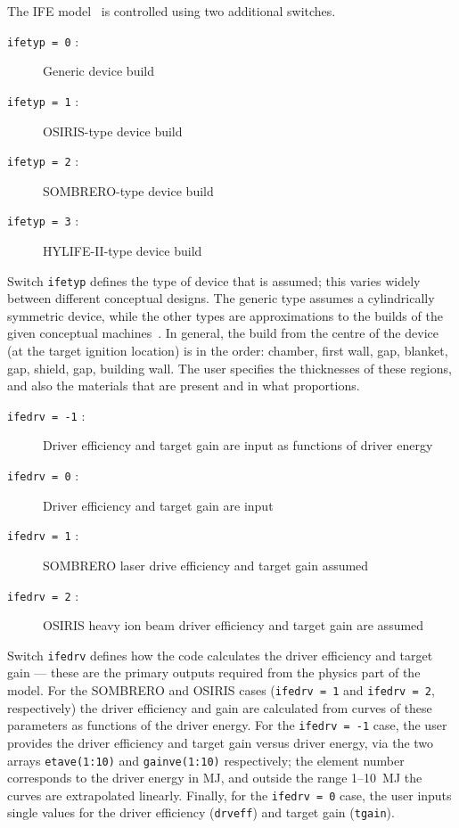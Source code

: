 \documentclass[11pt,a4paper]{report}
\begin{document}
The IFE model~\cite{process_ife} is controlled using two additional switches.
\begin{description}
\item [\texttt{ifetyp = 0} :] Generic device build
\item [\texttt{ifetyp = 1} :] OSIRIS-type device build~\cite{osiris1,osiris2,osiris3}
\item [\texttt{ifetyp = 2} :] SOMBRERO-type device build~\cite{sombrero1,sombrero2}
\item [\texttt{ifetyp = 3} :] HYLIFE-II-type device build~\cite{hylife1,hylife2,hylife3}
\end{description}
Switch \texttt{ifetyp} defines the type of device that is assumed; this varies
widely between different conceptual designs. The generic type assumes a
cylindrically symmetric device, while the other types are approximations to
the builds of the given conceptual machines~\cite{ife_build}. In general, the
build from the centre of the device (at the target ignition location) is in
the order: chamber, first wall, gap, blanket, gap, shield, gap, building
wall. The user specifies the thicknesses of these regions, and also the
materials that are present and in what proportions. \Red{[expand]} %

\begin{description}
\item [\texttt{ifedrv = -1} :] Driver efficiency and target gain are input as
  functions of driver energy
\item [\texttt{ifedrv = 0} :] Driver efficiency and target gain are input
\item [\texttt{ifedrv = 1} :] SOMBRERO laser drive efficiency and target gain assumed
\item [\texttt{ifedrv = 2} :] OSIRIS heavy ion beam driver efficiency and
  target gain are assumed~\cite{ife_driver}
\end{description}
Switch \texttt{ifedrv} defines how the code calculates the driver efficiency
and target gain --- these are the primary outputs required from the physics
part of the model. For the SOMBRERO and OSIRIS cases (\texttt{ifedrv = 1} and
\texttt{ifedrv = 2}, respectively) the driver efficiency and gain are
calculated from curves of these parameters as functions of the driver
energy. For the \texttt{ifedrv = -1} case, the user provides the driver
efficiency and target gain versus driver energy, via the two arrays
\texttt{etave(1:10)} and \texttt{gainve(1:10)} respectively; the element number
corresponds to the driver energy in MJ, and outside the range 1--10~MJ the
curves are extrapolated linearly. Finally, for the \texttt{ifedrv = 0} case,
the user inputs single values for the driver efficiency (\texttt{drveff}) and
target gain (\texttt{tgain}).
\end{document}
